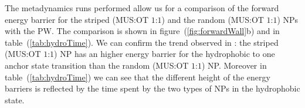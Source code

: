 The metadynamics runs performed allow us for a comparison of the forward energy barrier for the striped (\ac{MUS}:\ac{OT} $1$:$1$) and the random (\ac{MUS}:\ac{OT} $1$:$1$) \acp{NP} with the \ac{PW}. The comparison is shown in figure~(\ref{fig:forwardWall}b) and in table~(\ref{tab:hydroTime}). We can confirm the trend observed in \cite{ourPaper}: the striped (\ac{MUS}:\ac{OT} $1$:$1$) \ac{NP} has an higher energy barrier for the hydrophobic to one anchor state transition than the random (\ac{MUS}:\ac{OT} $1$:$1$) \ac{NP}. Moreover in table~(\ref{tab:hydroTime}) we can see that the different height of the energy barriers is reflected by the time spent by the two types of \acp{NP} in the hydrophobic state. 



